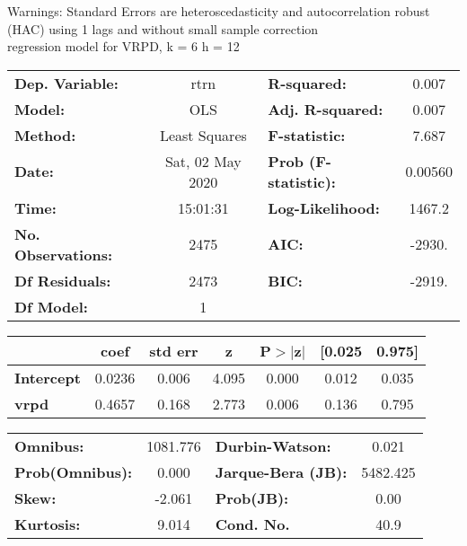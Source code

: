 Warnings: \newline
 [1] Standard Errors are heteroscedasticity and autocorrelation robust (HAC) using 1 lags and without small sample correction\\ 

regression model for VRPD, k = 6 h = 12\begin{center}
\begin{tabular}{lclc}
\toprule
\textbf{Dep. Variable:}    &       rtrn       & \textbf{  R-squared:         } &     0.007   \\
\textbf{Model:}            &       OLS        & \textbf{  Adj. R-squared:    } &     0.007   \\
\textbf{Method:}           &  Least Squares   & \textbf{  F-statistic:       } &     7.687   \\
\textbf{Date:}             & Sat, 02 May 2020 & \textbf{  Prob (F-statistic):} &  0.00560    \\
\textbf{Time:}             &     15:01:31     & \textbf{  Log-Likelihood:    } &    1467.2   \\
\textbf{No. Observations:} &        2475      & \textbf{  AIC:               } &    -2930.   \\
\textbf{Df Residuals:}     &        2473      & \textbf{  BIC:               } &    -2919.   \\
\textbf{Df Model:}         &           1      & \textbf{                     } &             \\
\bottomrule
\end{tabular}
\begin{tabular}{lcccccc}
                   & \textbf{coef} & \textbf{std err} & \textbf{z} & \textbf{P$> |$z$|$} & \textbf{[0.025} & \textbf{0.975]}  \\
\midrule
\textbf{Intercept} &       0.0236  &        0.006     &     4.095  &         0.000        &        0.012    &        0.035     \\
\textbf{vrpd}      &       0.4657  &        0.168     &     2.773  &         0.006        &        0.136    &        0.795     \\
\bottomrule
\end{tabular}
\begin{tabular}{lclc}
\textbf{Omnibus:}       & 1081.776 & \textbf{  Durbin-Watson:     } &    0.021  \\
\textbf{Prob(Omnibus):} &   0.000  & \textbf{  Jarque-Bera (JB):  } & 5482.425  \\
\textbf{Skew:}          &  -2.061  & \textbf{  Prob(JB):          } &     0.00  \\
\textbf{Kurtosis:}      &   9.014  & \textbf{  Cond. No.          } &     40.9  \\
\bottomrule
\end{tabular}
\end{center}

